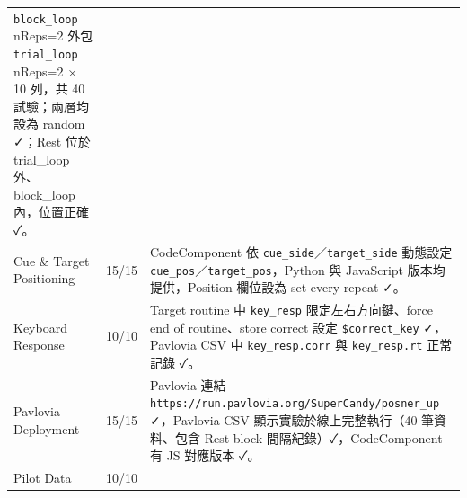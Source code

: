 \documentclass[14pt,]{extarticle}
\begin{document}
\begin{longtable}[]{@{}lll@{}}
\begin{minipage}[t]{0.09\columnwidth}
\texttt{block\_loop} nReps=2 外包 \texttt{trial\_loop} nReps=2 × 10
列，共 40 試驗；兩層均設為 random ✓；Rest 位於 trial\_loop
外、block\_loop 內，位置正確 ✓。\strut
\end{minipage}\tabularnewline
\begin{minipage}[t]{0.09\columnwidth}\raggedright
Cue \& Target Positioning\strut
\end{minipage} & \begin{minipage}[t]{0.09\columnwidth}\raggedright
15/15\strut
\end{minipage} & \begin{minipage}[t]{0.09\columnwidth}\raggedright
CodeComponent 依 \texttt{cue\_side}／\texttt{target\_side} 動態設定
\texttt{cue\_pos}／\texttt{target\_pos}，Python 與 JavaScript
版本均提供，Position 欄位設為 set every repeat ✓。\strut
\end{minipage}\tabularnewline
\begin{minipage}[t]{0.09\columnwidth}\raggedright
Keyboard Response\strut
\end{minipage} & \begin{minipage}[t]{0.09\columnwidth}\raggedright
10/10\strut
\end{minipage} & \begin{minipage}[t]{0.09\columnwidth}\raggedright
Target routine 中 \texttt{key\_resp} 限定左右方向鍵、force end of
routine、store correct 設定 \texttt{\$correct\_key} ✓，Pavlovia CSV 中
\texttt{key\_resp.corr} 與 \texttt{key\_resp.rt} 正常記錄 ✓。\strut
\end{minipage}\tabularnewline
\begin{minipage}[t]{0.09\columnwidth}\raggedright
Pavlovia Deployment\strut
\end{minipage} & \begin{minipage}[t]{0.09\columnwidth}\raggedright
15/15\strut
\end{minipage} & \begin{minipage}[t]{0.09\columnwidth}\raggedright
Pavlovia 連結 \texttt{https://run.pavlovia.org/SuperCandy/posner\_up}
✓，Pavlovia CSV 顯示實驗於線上完整執行（40 筆資料、包含 Rest block
間隔紀錄）✓，CodeComponent 有 JS 對應版本 ✓。\strut
\end{minipage}\tabularnewline
\begin{minipage}[t]{0.09\columnwidth}\raggedright
Pilot Data\strut
\end{minipage} & \begin{minipage}[t]{0.09\columnwidth}\raggedright
10/10\strut
\end{minipage} & \begin{minipage}[t]{0.09\columnwidth}\raggedright

\end{minipage}
\end{longtable}
\end{document}
